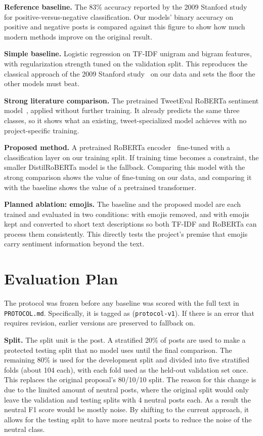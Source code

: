 \documentclass[sigconf,nonacm]{acmart}
\begin{document}
\textbf{Reference baseline.} The 83\% accuracy reported by the 2009 Stanford study~\cite{go2009twitter} for positive-versus-negative classification. Our models' binary accuracy on positive and negative posts is compared against this figure to show how much modern methods improve on the original result.
 
\textbf{Simple baseline.} Logistic regression on TF-IDF unigram and bigram features, with regularization strength tuned on the validation split. This reproduces the classical approach of the 2009 Stanford study~\cite{go2009twitter} on our data and sets the floor the other models must beat.
 
\textbf{Strong literature comparison.} The pretrained TweetEval RoBERTa sentiment model~\cite{barbieri2020tweeteval}, applied without further training. It already predicts the same three classes, so it shows what an existing, tweet-specialized model achieves with no project-specific training.
 
\textbf{Proposed method.} A pretrained RoBERTa encoder~\cite{liu2019roberta} fine-tuned with a classification layer on our training split. If training time becomes a constraint, the smaller DistilRoBERTa model is the fallback. Comparing this model with the strong comparison shows the value of fine-tuning on our data, and comparing it with the baseline shows the value of a pretrained transformer.
 
\textbf{Planned ablation: emojis.} The baseline and the proposed model are each trained and evaluated in two conditions: with emojis removed, and with emojis kept and converted to short text descriptions so both TF-IDF and RoBERTa can process them consistently. This directly tests the project's premise that emojis carry sentiment information beyond the text.

\section{Evaluation Plan}
\label{sec:protocol}
The protocol was frozen before any baseline was scored with the full text in \texttt{PROTOCOL.md}. Specifically, it is tagged as (\texttt{protocol-v1}). If there is an error that requires revision, earlier versions are preserved to fallback on. 

\textbf{Split.}
The split unit is the post. A stratified 20\% of posts are used to make a protected testing split that no model uses until the final comparison. The remaining 80\% is used  for the development split and divided into five stratified folds (about 104 each), with each fold used as the held-out validation set once. This replaces the original proposal's 80/10/10 split. The reason for this change is due to the limited amount of neutral posts, where the original split would only leave the validation and testing splits with 4 neutral posts each. As a result the neutral F1 score would be mostly noise. By shifting to the current approach, it allows for the testing split to have more neutral posts to reduce the noise of the neutral class. 
\end{document}
